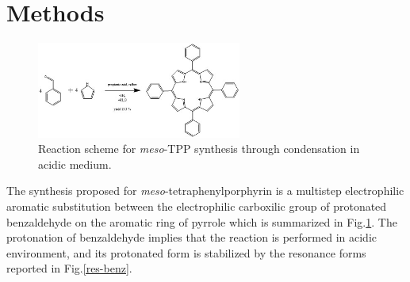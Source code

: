\documentclass[twoside,twocolumn,9pt]{article}
\begin{document}
\section{Methods}
\begin{figure}[t!]
	\centering
	\includegraphics[width=0.6\textwidth]{reaction}
	\caption{Reaction scheme for \textit{meso}-TPP synthesis through condensation in acidic medium.}
	\label{reaction}
\end{figure}
The synthesis proposed for \textit{meso}-tetraphenylporphyrin is a multistep electrophilic aromatic substitution between the electrophilic carboxilic group of protonated benzaldehyde on the aromatic ring of pyrrole which is summarized in Fig.\ref{reaction}.
The protonation of benzaldehyde implies that the reaction is performed in acidic environment, and its protonated form is stabilized by the resonance forms reported in Fig.\ref{res-benz}.\\
\end{document}

